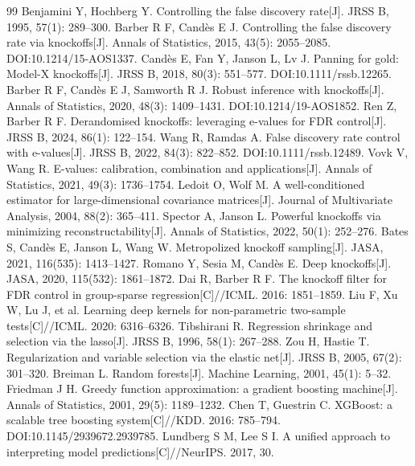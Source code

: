 \documentclass[UTF8,12pt,a4paper]{ctexart}
\begin{document}
\newpage
\renewcommand{\refname}{11、主要参考文献}
\scriptsize
{}
\begin{thebibliography}{99}
 Benjamini Y, Hochberg Y. Controlling the false discovery rate[J]. JRSS B, 1995, 57(1): 289--300.
 Barber R F, Candès E J. Controlling the false discovery rate via knockoffs[J]. Annals of Statistics, 2015, 43(5): 2055--2085. DOI:10.1214/15-AOS1337.
 Candès E, Fan Y, Janson L, Lv J. Panning for gold: Model-X knockoffs[J]. JRSS B, 2018, 80(3): 551--577. DOI:10.1111/rssb.12265.
 Barber R F, Candès E J, Samworth R J. Robust inference with knockoffs[J]. Annals of Statistics, 2020, 48(3): 1409--1431. DOI:10.1214/19-AOS1852.
 Ren Z, Barber R F. Derandomised knockoffs: leveraging e-values for FDR control[J]. JRSS B, 2024, 86(1): 122--154.
 Wang R, Ramdas A. False discovery rate control with e-values[J]. JRSS B, 2022, 84(3): 822--852. DOI:10.1111/rssb.12489.
 Vovk V, Wang R. E-values: calibration, combination and applications[J]. Annals of Statistics, 2021, 49(3): 1736--1754.
 Ledoit O, Wolf M. A well-conditioned estimator for large-dimensional covariance matrices[J]. Journal of Multivariate Analysis, 2004, 88(2): 365--411.
 Spector A, Janson L. Powerful knockoffs via minimizing reconstructability[J]. Annals of Statistics, 2022, 50(1): 252--276.
 Bates S, Candès E, Janson L, Wang W. Metropolized knockoff sampling[J]. JASA, 2021, 116(535): 1413--1427.
 Romano Y, Sesia M, Candès E. Deep knockoffs[J]. JASA, 2020, 115(532): 1861--1872.
 Dai R, Barber R F. The knockoff filter for FDR control in group-sparse regression[C]//ICML. 2016: 1851--1859.
 Liu F, Xu W, Lu J, et al. Learning deep kernels for non-parametric two-sample tests[C]//ICML. 2020: 6316--6326.
 Tibshirani R. Regression shrinkage and selection via the lasso[J]. JRSS B, 1996, 58(1): 267--288.
 Zou H, Hastie T. Regularization and variable selection via the elastic net[J]. JRSS B, 2005, 67(2): 301--320.
 Breiman L. Random forests[J]. Machine Learning, 2001, 45(1): 5--32.
 Friedman J H. Greedy function approximation: a gradient boosting machine[J]. Annals of Statistics, 2001, 29(5): 1189--1232.
 Chen T, Guestrin C. XGBoost: a scalable tree boosting system[C]//KDD. 2016: 785--794. DOI:10.1145/2939672.2939785.
 Lundberg S M, Lee S I. A unified approach to interpreting model predictions[C]//NeurIPS. 2017, 30.

\end{thebibliography}
\end{document}
